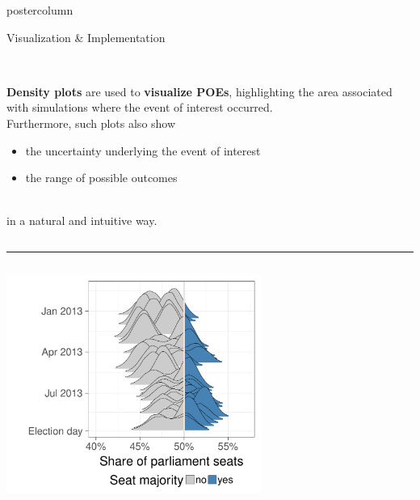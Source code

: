 \documentclass[final,hyperref={pdfpagelabels=false}]{beamer}
\let\olditem\item
\renewcommand\item{\justifying\olditem} %
\newcommand{\darkgray}[1]{\textcolor{koaladarkgray}{#1}}
\begin{document}
\begin{frame}
\begin{columns}
\begin{column}{1\textwidth}
\begin{columns}[T]
\begin{column}{.484\textwidth}
\begin{beamercolorbox}[center,wd=\textwidth]{postercolumn}
\begin{minipage}[T]{.95\textwidth}
\begin{block}{\footnotesize Visualization \& Implementation}
\begin{columns}[t]
  \begin{column}{.6\textwidth}
  \ \\
  \darkgray{\textbf{Density plots}} are used to \darkgray{\textbf{visualize POEs}}, highlighting the area
  associated with simulations where the event of interest occurred. \\
  Furthermore, such plots also show
  \begin{minipage}{\textwidth}
  \hspace{0.5in}
  \begin{itemize}
    \item the uncertainty underlying the event of interest
    \item the range of possible outcomes
  \end{itemize}
  \end{minipage}
  \\[20px]
  in a natural and intuitive way.
  \end{column}
\end{columns}
\vspace{1ex}
\textcolor{LMUlightgray}{\hrule{}}
\vspace{1ex}
\begin{columns}[t]
  \begin{column}{.35\textwidth}
  \begin{center}\centering
  \includegraphics[height=270px]{figures/vis_seatDist_time}
  \end{center}
  \end{column}

  \hspace{-1.5ex}
  \textcolor{LMUlightgray}{\vrule{}}
  \hspace{1.5ex}


\end{columns}
\end{block}
\end{minipage}
\end{beamercolorbox}
\end{column}
\end{columns}
\end{column}
\end{columns}
\end{frame}
\end{document}
